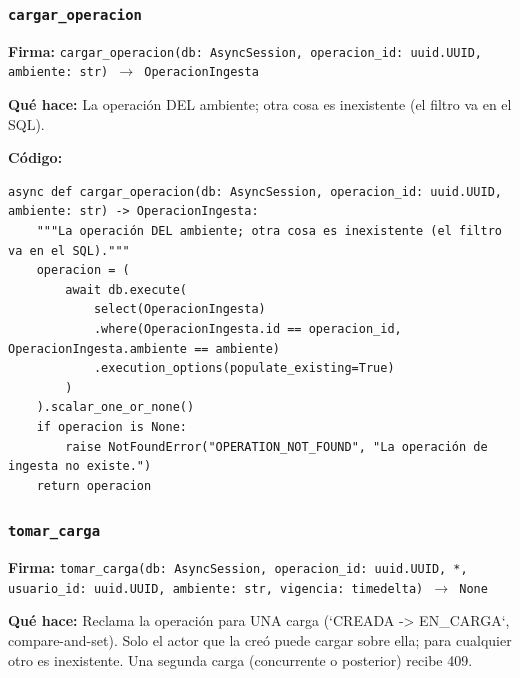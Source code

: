 \documentclass[11pt,a4paper]{article}
\begin{document}
\subsubsection*{\texttt{cargar\_operacion}}
\textbf{Firma:} \texttt{cargar\_operacion(db: AsyncSession, operacion\_id: uuid.UUID, ambiente: str) $\rightarrow$ OperacionIngesta}

\textbf{Qué hace:} La operación DEL ambiente; otra cosa es inexistente (el filtro va en el SQL).

\textbf{Código:}
\begin{lstlisting}
async def cargar_operacion(db: AsyncSession, operacion_id: uuid.UUID, ambiente: str) -> OperacionIngesta:
    """La operación DEL ambiente; otra cosa es inexistente (el filtro va en el SQL)."""
    operacion = (
        await db.execute(
            select(OperacionIngesta)
            .where(OperacionIngesta.id == operacion_id, OperacionIngesta.ambiente == ambiente)
            .execution_options(populate_existing=True)
        )
    ).scalar_one_or_none()
    if operacion is None:
        raise NotFoundError("OPERATION_NOT_FOUND", "La operación de ingesta no existe.")
    return operacion
\end{lstlisting}

\subsubsection*{\texttt{tomar\_carga}}
\textbf{Firma:} \texttt{tomar\_carga(db: AsyncSession, operacion\_id: uuid.UUID, *, usuario\_id: uuid.UUID, ambiente: str, vigencia: timedelta) $\rightarrow$ None}

\textbf{Qué hace:} Reclama la operación para UNA carga (`CREADA -> EN\_CARGA`, compare-and-set). Solo el actor que la creó puede
cargar sobre ella; para cualquier otro es inexistente. Una segunda carga (concurrente o posterior) recibe 409.
\end{document}
